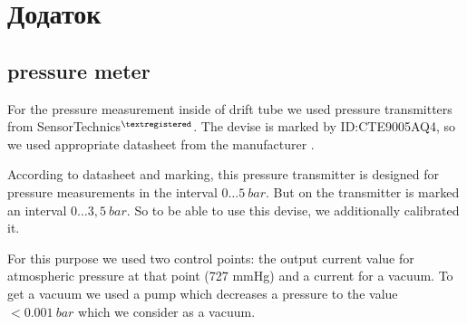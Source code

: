\documentclass[12pt,a4paper]{article}
\begin{document}
	
	
	
	    
		
	
	
	
	
\newpage
\section{Додаток}

\subsection{pressure meter}

	For the pressure measurement inside of drift tube we used pressure transmitters from SensorTechnics$^{\textregistered}$. The devise is marked by ID:CTE9005AQ4, so we used appropriate datasheet  from the manufacturer \cite{presTransmitDatasheet}.
	
	According to datasheet and marking, this pressure transmitter is designed for pressure measurements in the interval $0 \dots 5~bar$. But on the transmitter is marked an interval $0\dots 3,5~bar$. So to be able to use this devise, we additionally calibrated it.
	
	For this purpose we used two control points: the output current value for atmospheric pressure at that point (727 mmHg) and a current for a vacuum. To get a vacuum we used a pump which decreases a pressure to the value  $<0.001~bar$ which we consider as a vacuum.
	
\end{document}
